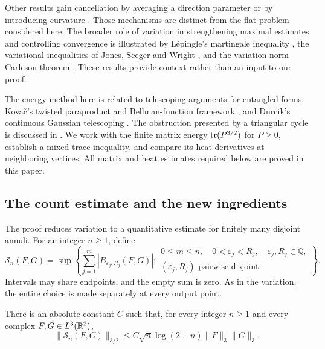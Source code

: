 Other results gain cancellation by averaging a direction parameter
\cite{DurcikRoos2021,LinSlavikova2026} or by introducing curvature
\cite{ChristDurcikRoos2021,HsuLin2026}. Those mechanisms are distinct
from the flat problem considered here. The broader role of variation
in strengthening maximal estimates and controlling convergence is
illustrated by L\'epingle's martingale inequality
\cite{Lepingle1976}, the variational inequalities of Jones, Seeger and
Wright \cite{JonesSeegerWright2008}, and the variation-norm Carleson
theorem \cite{OberlinSeegerTaoThieleWright2012}. These results provide
context rather than an input to our proof.

The energy method here is related to telescoping arguments for
entangled forms: Kova\v{c}'s twisted paraproduct and Bellman-function
framework \cite{Kovac2012Twisted,Kovac2011}, and Durcik's continuous
Gaussian telescoping \cite{Durcik2015,Durcik2017}. The obstruction
presented by a triangular cycle is discussed in
\cite[Section~6.2]{Kovac2011}. We work with the finite matrix energy
$\operatorname{tr}(P^{3/2})$ for $P\ge0$, establish a mixed trace inequality, and compare
its heat derivatives at neighboring vertices. All matrix and heat
estimates required below are proved in this paper.

\subsection{The count estimate and the new ingredients}

The proof reduces variation to a quantitative estimate for finitely
many disjoint annuli. For an integer $n\ge1$, define
\begin{equation}\label{eq:count-definition}
 \mathcal S_n(F,G)
 =\sup\left\{\sum_{j=1}^m|B_{\varepsilon_j,R_j}(F,G)|:
 \begin{array}{l}
 0\le m\le n,\quad 0<\varepsilon_j<R_j,\quad
     \varepsilon_j,R_j\in\mathbb Q,\\
 (\varepsilon_j,R_j)\text{ pairwise disjoint}
 \end{array}\right\}.
\end{equation}
Intervals may share endpoints, and the empty sum is zero. As in the
variation, the entire choice is made separately at every output point.

\begin{theorem}\label{thm:count}
There is an absolute constant $C$ such that, for every integer $n\ge1$
and every complex $F,G\in L^3(\mathbb R^2)$,
\begin{equation}\label{eq:count-bound}
 \|\mathcal S_n(F,G)\|_{3/2}
 \le C\sqrt n\log(2+n)\|F\|_3\|G\|_3.
\end{equation}
\end{theorem}

